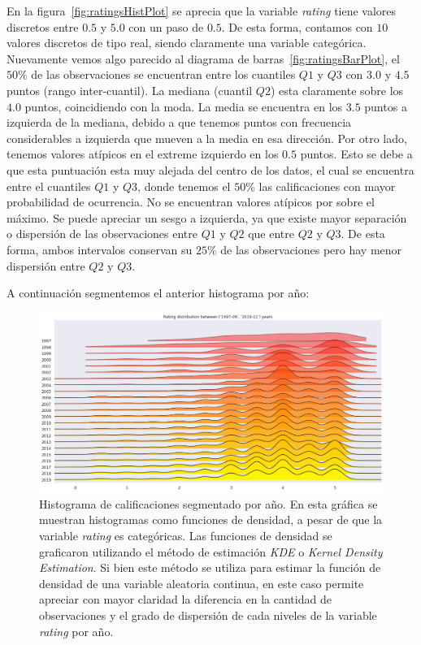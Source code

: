 \documentclass[11pt,a4paper,twoside]{thesis}
\begin{document}
En la figura~\ref{fig:ratingsHistPlot} se aprecia que la variable
\textit{rating} tiene valores discretos entre $0.5$ y $5.0$ con un paso de
$0.5$. De esta forma, contamos con $10$ valores discretos de tipo real, siendo
claramente una variable categórica. Nuevamente vemos algo parecido al diagrama
de barras~\ref{fig:ratingsBarPlot}, el $50\%$ de las observaciones se
encuentran entre los cuantiles $Q1$ y $Q3$ con $3.0$ y $4.5$ puntos (rango
inter-cuantil). La mediana (cuantil $Q2$) esta claramente sobre los $4.0$
puntos, coincidiendo con la moda. La media se encuentra en los $3.5$ puntos a
izquierda de la mediana, debido a que tenemos puntos con frecuencia
considerables a izquierda que mueven a la media en esa dirección. Por otro
lado, tenemos valores atípicos en el extreme izquierdo en los $0.5$ puntos.
Esto se debe a que esta puntuación esta muy alejada del centro de los datos, el
cual se encuentra entre el cuantiles $Q1$ y $Q3$, donde tenemos el $50\%$ las
calificaciones con mayor probabilidad de ocurrencia. No se encuentran valores
atípicos por sobre el máximo. Se puede apreciar un sesgo a izquierda, ya que
existe mayor separación o dispersión de las observaciones entre $Q1$ y $Q2$ que
entre $Q2$ y $Q3$. De esta forma, ambos intervalos conservan su $25\%$ de las
observaciones pero hay menor dispersión entre $Q2$ y $Q3$.

\clearpage
A continuación segmentemos el anterior histograma por año:

\begin{figure}[h!]
	\centering
	\includegraphics[width=15cm]{./images/rating-by-year.png}
	\caption{
		Histograma de calificaciones segmentado por año.
		En esta gráfica se muestran histogramas como funciones de densidad,
		a pesar de que la variable \textit{rating}
		es categóricas. Las funciones de densidad se graficaron utilizando el
		método de estimación \textit{KDE} o \textit{Kernel Density Estimation}.
		Si bien este método se utiliza para estimar la función de densidad
		de una variable aleatoria continua, en este caso permite apreciar con mayor claridad
		la diferencia en la cantidad de observaciones y el grado de dispersión de cada
		niveles de la variable \textit{rating} por año.
	}
	\label{fig:ratingsYearHistPlot}
\end{figure}
\end{document}
